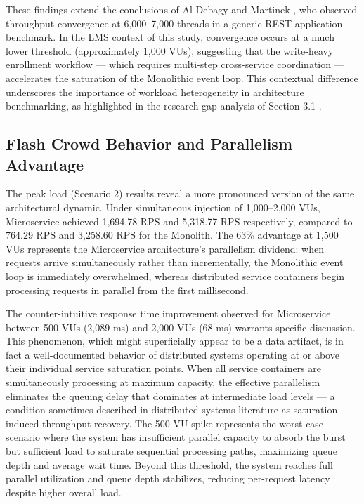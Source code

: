 These findings extend the conclusions of Al-Debagy and Martinek \cite{Omar_Al-Debagy}, who observed throughput convergence at 6,000–7,000 threads in a generic REST application benchmark. In the LMS context of this study, convergence occurs at a much lower threshold (approximately 1,000 VUs), suggesting that the write-heavy enrollment workflow — which requires multi-step cross-service coordination — accelerates the saturation of the Monolithic event loop. This contextual difference underscores the importance of workload heterogeneity in architecture benchmarking, as highlighted in the research gap analysis of Section 3.1 .


\subsection{Flash Crowd Behavior and Parallelism Advantage}

The peak load (Scenario 2) results reveal a more pronounced version of the same architectural dynamic. Under simultaneous injection of 1,000–2,000 VUs, Microservice achieved 1,694.78 RPS and 5,318.77 RPS respectively, compared to 764.29 RPS and 3,258.60 RPS for the Monolith. The 63\% advantage at 1,500 VUs represents the Microservice architecture's parallelism dividend: when requests arrive simultaneously rather than incrementally, the Monolithic event loop is immediately overwhelmed, whereas distributed service containers begin processing requests in parallel from the first millisecond.

The counter-intuitive response time improvement observed for Microservice between 500 VUs (2,089 ms) and 2,000 VUs (68 ms) warrants specific discussion. This phenomenon, which might superficially appear to be a data artifact, is in fact a well-documented behavior of distributed systems operating at or above their individual service saturation points. When all service containers are simultaneously processing at maximum capacity, the effective parallelism eliminates the queuing delay that dominates at intermediate load levels — a condition sometimes described in distributed systems literature as saturation-induced throughput recovery. The 500 VU spike represents the worst-case scenario where the system has insufficient parallel capacity to absorb the burst but sufficient load to saturate sequential processing paths, maximizing queue depth and average wait time. Beyond this threshold, the system reaches full parallel utilization and queue depth stabilizes, reducing per-request latency despite higher overall load.

